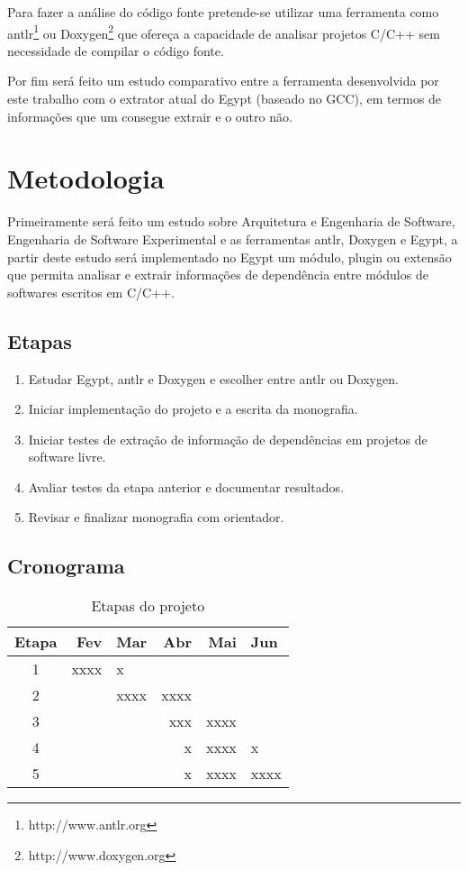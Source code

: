 Para fazer a análise do código fonte pretende-se utilizar uma ferramenta como
antlr\footnote{http://www.antlr.org} ou Doxygen\footnote{http://www.doxygen.org}
que ofereça a capacidade de analisar projetos C/C++ sem necessidade de compilar
o código fonte.

Por fim será feito um estudo comparativo entre a ferramenta desenvolvida por
este trabalho com o extrator atual do Egypt (baseado no GCC), em termos de
informações que um consegue extrair e o outro não.

\chapter{Metodologia}

Primeiramente será feito um estudo sobre Arquitetura e Engenharia de Software,
Engenharia de Software Experimental e as ferramentas antlr, Doxygen e Egypt, a
partir deste estudo será implementado no Egypt um módulo, plugin ou extensão
que permita analisar e extrair informações de dependência entre módulos de
softwares escritos em C/C++.

\section{Etapas}

\begin{enumerate}
\item Estudar Egypt, antlr e Doxygen e escolher entre antlr ou Doxygen.
\item Iniciar implementação do projeto e a escrita da monografia.
\item Iniciar testes de extração de informação de dependências em projetos de software livre.
\item Avaliar testes da etapa anterior e documentar resultados.
\item Revisar e finalizar monografia com orientador.
\end{enumerate}

\section{Cronograma}

\begin{table}
\caption{Etapas do projeto}
\centering
\begin{tabular}{c r l r r l}
Etapa  & Fev  & Mar  & Abr  & Mai & Jun \\
\hline
1      & xxxx & x    &      &      &      \\
2      &      & xxxx & xxxx &      &      \\
3      &      &      &  xxx & xxxx &      \\
4      &      &      &    x & xxxx & x    \\
5      &      &      &    x & xxxx & xxxx \\
\hline
\end{tabular}
\end{table}
